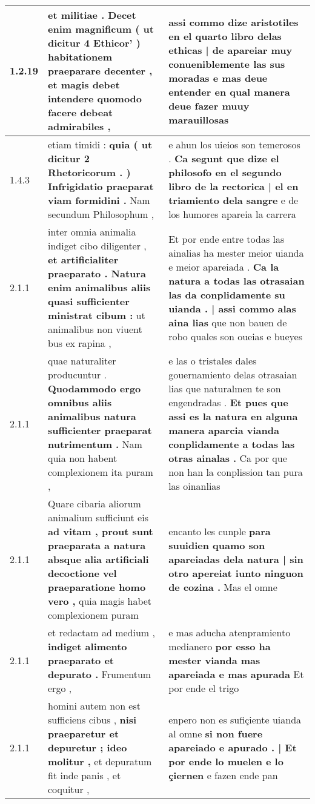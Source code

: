 \begin{tabular}{|p{1cm}|p{6.5cm}|p{6.5cm}|}

\hline
1.2.19 & et militiae . Decet enim magnificum \textbf{ ( ut dicitur 4 Ethicor’ ) habitationem praeparare decenter , } et magis debet intendere quomodo facere debeat admirabiles , & assi commo dize aristotiles \textbf{ en el quarto libro delas ethicas | de apareiar muy conueniblemente las sus moradas } e mas deue entender en qual manera deue fazer muuy marauillosas \\\hline
1.4.3 & etiam timidi : \textbf{ quia ( ut dicitur 2 Rhetoricorum . ) Infrigidatio praeparat viam formidini . } Nam secundum Philosophum , & e ahun los uieios son temerosos . \textbf{ Ca segunt que dize el philosofo en el segundo libro de la rectorica | el en triamiento dela sangre } e de los humores apareia la carrera \\\hline
2.1.1 & inter omnia animalia indiget cibo diligenter , \textbf{ et artificialiter praeparato . Natura enim animalibus aliis quasi sufficienter ministrat cibum : } ut animalibus non viuent bus ex rapina , & Et por ende entre todas las ainalias ha mester meior uianda e meior apareiada . \textbf{ Ca la natura a todas las otrasaian las da conplidamente su uianda . | assi commo alas aina lias } que non bauen de robo quales son oueias e bueyes \\\hline
2.1.1 & quae naturaliter producuntur . \textbf{ Quodammodo ergo omnibus aliis animalibus natura sufficienter praeparat nutrimentum . } Nam quia non habent complexionem ita puram , & e las o tristales dales gouernamiento delas otrasaian lias que naturalmen te son engendradas . \textbf{ Et pues que assi es la natura en alguna manera aparcia vianda conplidamente a todas las otras ainalas . } Ca por que non han la conplission tan pura las oinanlias \\\hline
2.1.1 & Quare cibaria aliorum animalium sufficiunt eis \textbf{ ad vitam , prout sunt praeparata a natura absque alia artificiali decoctione vel praeparatione homo vero , } quia magis habet complexionem puram & encanto les cunple \textbf{ para suuidien quamo son apareiadas dela natura | sin otro apereiat iunto ninguon de cozina . } Mas el omne \\\hline
2.1.1 & et redactam ad medium , \textbf{ indiget alimento praeparato et depurato . } Frumentum ergo , & e mas aducha atenpramiento medianero \textbf{ por esso ha mester vianda mas apareiada e mas apurada } Et por ende el trigo \\\hline
2.1.1 & homini autem non est sufficiens cibus , \textbf{ nisi praeparetur et depuretur ; ideo molitur , } et depuratum fit inde panis , et coquitur , & enpero non es sufiçiente uianda al omne \textbf{ si non fuere apareiado e apurado . | Et por ende lo muelen e lo çiernen } e fazen ende pan \\\hline

\end{tabular}
